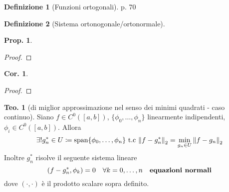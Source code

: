 \documentclass[a4paper,10pt]{article}
\theoremstyle{definition}
\theoremstyle{indentdefinition}
\newtheorem{defn}{Definizione}[section]
\theoremstyle{indenttheorem}
\newtheorem{thm}{Teo.}
\newtheorem{prop}{Prop.}
\newtheorem{cor}{Cor.}
\theoremstyle{myremark}
\theoremstyle{indentgeneral}
\theoremstyle{plain}
\theoremstyle{plain}
\newenvironment{myboxed} 
{\noindent\begin{lrbox}{\mybox}\begin{minipage}{\textwidth}}
{\end{minipage}\end{lrbox}\fbox{\usebox{\mybox}}}
\begin{document}
\begin{defn}[Funzioni ortogonali]
    p. 70
\end{defn}

\begin{defn}[Sistema ortonogonale/ortonormale]
    
\end{defn}

\begin{prop}
    
\end{prop}

\begin{proof}
    
\end{proof}

\begin{cor}
    
\end{cor}

\begin{proof}
    
\end{proof}



\begin{myboxed}
    \begin{thm}[di miglior approssimazione nel senso dei minimi quadrati - caso continuo]
        Siano $f\in C^0([a,b])$, $\{\phi_0,\ldots,\phi_n\}$ linearmente indipendenti, $\phi_i\in C^0([a,b])$. Allora 
        $$\exists!g_n^*\in U\coloneqq \text{span}\{\phi_0,\ldots,\phi_n\} \text{ t.c }\norm{f-g_n^*}_2=\min_{g_n\in U}\norm{f-g_n}_2$$
        Inoltre $g_n^*$ risolve il seguente sistema lineare
        $$(f-g_n^*,\phi_k)=0\quad \forall k=0,\ldots,n\quad\text{\textbf{equazioni normali}}$$
        dove $(\cdot,\cdot)$ è il prodotto scalare sopra definito.
    \end{thm}
\end{myboxed}
\end{document}
